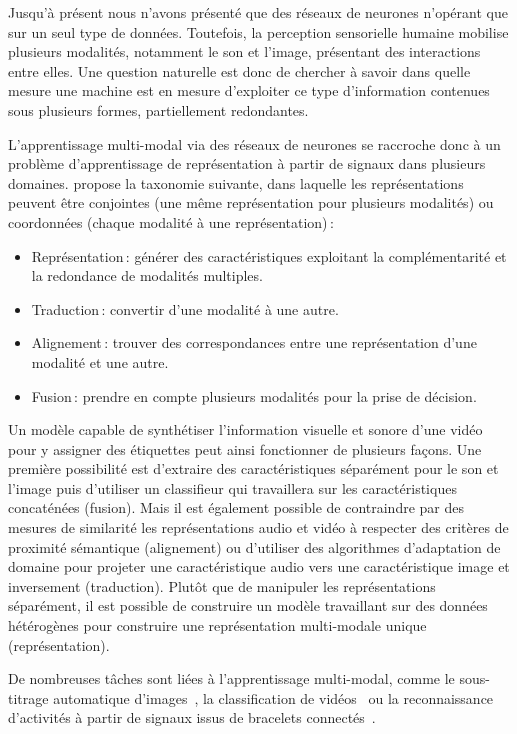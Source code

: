 Jusqu'à présent nous n'avons présenté que des réseaux de neurones n'opérant que sur un seul type de données. Toutefois, la perception sensorielle humaine mobilise plusieurs modalités, notamment le son et l'image, présentant des interactions entre elles. Une question naturelle est donc de chercher à savoir dans quelle mesure une machine est en mesure d'exploiter ce type d'information contenues sous plusieurs formes, partiellement redondantes.

L'apprentissage multi-modal via des réseaux de neurones se raccroche donc à un problème d'apprentissage de représentation à partir de signaux dans plusieurs domaines. \citet{baltrusaitis_multimodal_2017} propose la taxonomie suivante, dans laquelle les représentations peuvent être conjointes (une même représentation pour plusieurs modalités) ou coordonnées (chaque modalité à une représentation)\,:
\begin{itemize}
    \item Représentation\,: générer des caractéristiques exploitant la complémentarité et la redondance de modalités multiples.
    \item Traduction\,: convertir d'une modalité à une autre.
    \item Alignement\,: trouver des correspondances entre une représentation d'une modalité et une autre.
    \item Fusion\,: prendre en compte plusieurs modalités pour la prise de décision.
\end{itemize}

Un modèle capable de synthétiser l'information visuelle et sonore d'une vidéo pour y assigner des étiquettes peut ainsi fonctionner de plusieurs façons. Une première possibilité est d'extraire des caractéristiques séparément pour le son et l'image puis d'utiliser un classifieur qui travaillera sur les caractéristiques concaténées (fusion). Mais il est également possible de contraindre par des mesures de similarité les représentations audio et vidéo à respecter des critères de proximité sémantique (alignement) ou d'utiliser des algorithmes d'adaptation de domaine pour projeter une caractéristique audio vers une caractéristique image et inversement (traduction). Plutôt que de manipuler les représentations séparément, il est possible de construire un modèle travaillant sur des données hétérogènes pour construire une représentation multi-modale unique (représentation).

De nombreuses tâches sont liées à l'apprentissage multi-modal, comme le sous-titrage automatique d'images~\cite{karpathy_deep_2015}, la classification de vidéos~\cite{kim_deep_2013} ou la reconnaissance d'activités à partir de signaux issus de bracelets connectés~\cite{ordonez_deep_2016}.

